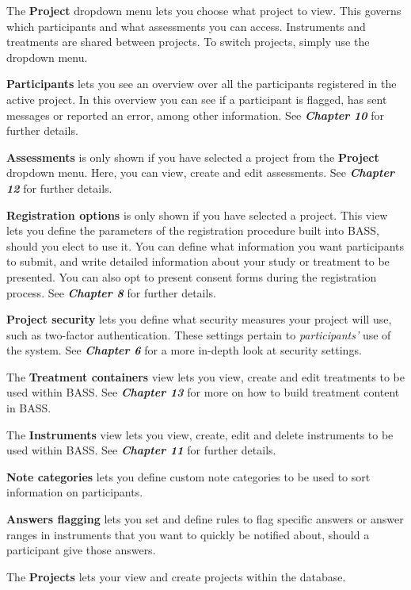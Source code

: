 \documentclass[
]{book}
\begin{document}
The \textbf{Project} dropdown menu lets you choose what project to view. This governs which participants and what assessments you can access. Instruments and treatments are shared between projects. To switch projects, simply use the dropdown menu.

\textbf{Participants} lets you see an overview over all the participants registered in the active project. In this overview you can see if a participant is flagged, has sent messages or reported an error, among other information. See \textbf{\emph{Chapter 10}} for further details.

\textbf{Assessments} is only shown if you have selected a project from the \textbf{Project} dropdown menu. Here, you can view, create and edit assessments. See \textbf{\emph{Chapter 12}} for further details.

\textbf{Registration options} is only shown if you have selected a project. This view lets you define the parameters of the registration procedure built into BASS, should you elect to use it. You can define what information you want participants to submit, and write detailed information about your study or treatment to be presented. You can also opt to present consent forms during the registration process. See \textbf{\emph{Chapter 8}} for further details.

\textbf{Project security} lets you define what security measures your project will use, such as two-factor authentication. These settings pertain to \emph{participants'} use of the system. See \textbf{\emph{Chapter 6}} for a more in-depth look at security settings.

The \textbf{Treatment containers} view lets you view, create and edit treatments to be used within BASS. See \textbf{\emph{Chapter 13}} for more on how to build treatment content in BASS.

The \textbf{Instruments} view lets you view, create, edit and delete instruments to be used within BASS. See \textbf{\emph{Chapter 11}} for further details.

\textbf{Note categories} lets you define custom note categories to be used to sort information on participants.

\textbf{Answers flagging} lets you set and define rules to flag specific answers or answer ranges in instruments that you want to quickly be notified about, should a participant give those answers.

The \textbf{Projects} lets your view and create projects within the database.
\end{document}
